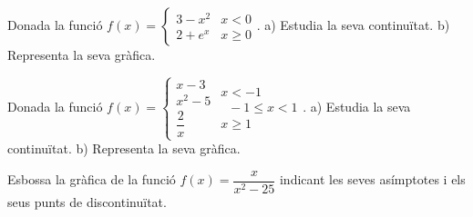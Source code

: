 \begin{mylist}
	\exer Donada la funció $f(x)=\left\{\begin{array}{cc} {3-x^{2} } & {x<0} \\ {2+e^{x} } & {x\ge 0} \end{array}\right. $.  a) Estudia la seva continuïtat. b) Representa la seva gràfica. 

	\exer Donada la funció $f(x)=\left\{\begin{array}{c} {x-3} \\ {x^{2} -5} \\ {\dfrac{2}{x} } \end{array}\begin{array}{c} {x<-1} \\ {\; \; -1\le x<1} \\ {x\ge 1} \end{array}\right. $.  a) Estudia la seva continuïtat. b) Representa la seva gràfica. 
	
	
	
	\exer Esbossa la gràfica de la funció $f(x)=\dfrac{x}{x^{2} -25} $ indicant les seves asímptotes i els seus punts de discontinuïtat.
	
 


\end{mylist}

